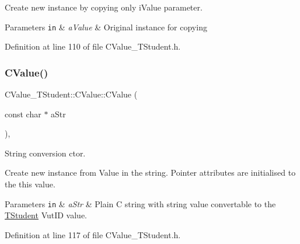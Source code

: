 Create new instance by copying only {\ttfamily i\+Value} parameter. 
\begin{DoxyParams}[1]{Parameters}
\mbox{\tt in}  & {\em a\+Value} & Original instance for copying \\
\hline
\end{DoxyParams}


Definition at line 110 of file C\+Value\+\_\+\+T\+Student.\+h.

\mbox{\label{class_c_value___t_student_1_1_c_value_a488e8a348d17591900a6dabe3525b797}} 
\subsubsection{\texorpdfstring{C\+Value()}{CValue()}\hspace{0.1cm}{\footnotesize\ttfamily [4/4]}}
{\footnotesize\ttfamily C\+Value\+\_\+\+T\+Student\+::\+C\+Value\+::\+C\+Value (\begin{DoxyParamCaption}\item[{const char $\ast$}]{a\+Str }\end{DoxyParamCaption})\hspace{0.3cm}{\ttfamily [inline]}, {\ttfamily [explicit]}}



String conversion c\textquotesingle{}tor. 

Create new instance from Value in the string. Pointer attributes are initialised to the {\ttfamily this} value. 
\begin{DoxyParams}[1]{Parameters}
\mbox{\tt in}  & {\em a\+Str} & Plain C string with string value convertable to the \hyperlink{struct_c_value___t_student_1_1_t_student}{T\+Student} Vut\+ID value. \\
\hline
\end{DoxyParams}


Definition at line 117 of file C\+Value\+\_\+\+T\+Student.\+h.

\mbox{\label{class_c_value___t_student_1_1_c_value_a2a4f5cdb7acace3f45674d4170ca4193}} 
